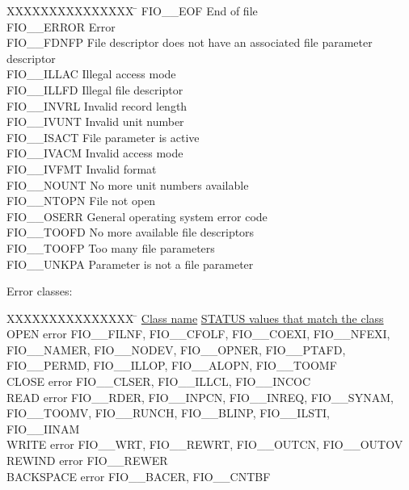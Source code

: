 \begin{tabbing}
XXXXXXXXXXXXXXX \= \kill
FIO\_\_EOF   \> End of file \\
FIO\_\_ERROR \> Error \\
FIO\_\_FDNFP \> File descriptor does not have an associated file parameter
descriptor \\
FIO\_\_ILLAC \footnotemark[1] \> Illegal access mode \\
FIO\_\_ILLFD \> Illegal file descriptor \\
FIO\_\_INVRL \> Invalid record length \\
FIO\_\_IVUNT \footnotemark[1] \> Invalid unit number \\
FIO\_\_ISACT \> File parameter is active \\
FIO\_\_IVACM \> Invalid access mode \\
FIO\_\_IVFMT \> Invalid format \\
FIO\_\_NOUNT \> No more unit numbers available \\
FIO\_\_NTOPN \> File not open \\
FIO\_\_OSERR \> General operating system error code \\
FIO\_\_TOOFD \> No more available file descriptors \\
FIO\_\_TOOFP \> Too many file parameters \\
FIO\_\_UNKPA \> Parameter is not a file parameter \\

\end{tabbing}


Error classes:

\begin{tabbing}
XXXXXXXXXXXXXXX \= \kill
\underline{Class name} \> \underline{STATUS values that match the class} \\
OPEN error \> FIO\_\_FILNF, FIO\_\_CFOLF, FIO\_\_COEXI, FIO\_\_NFEXI, \\
           \> FIO\_\_NAMER, FIO\_\_NODEV, FIO\_\_OPNER, FIO\_\_PTAFD, \\
           \> FIO\_\_PERMD, FIO\_\_ILLOP, FIO\_\_ALOPN, FIO\_\_TOOMF \\
CLOSE error \> FIO\_\_CLSER, FIO\_\_ILLCL, FIO\_\_INCOC \\
READ error  \> FIO\_\_RDER, FIO\_\_INPCN, FIO\_\_INREQ, FIO\_\_SYNAM, \\
            \> FIO\_\_TOOMV, FIO\_\_RUNCH, FIO\_\_BLINP, FIO\_\_ILSTI, \\
            \> FIO\_\_IINAM \\
WRITE error \> FIO\_\_WRT, FIO\_\_REWRT, FIO\_\_OUTCN, FIO\_\_OUTOV \\
REWIND error \> FIO\_\_REWER \\
BACKSPACE error \> FIO\_\_BACER, FIO\_\_CNTBF \\
\end{tabbing}

